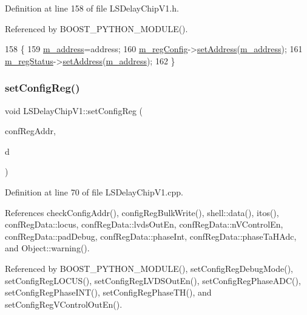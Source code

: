 Definition at line 158 of file L\+S\+Delay\+Chip\+V1.\+h.



Referenced by B\+O\+O\+S\+T\+\_\+\+P\+Y\+T\+H\+O\+N\+\_\+\+M\+O\+D\+U\+L\+E().


\begin{DoxyCode}
158                              \{
159     \hyperlink{classLSDelayChipV1_a6fba278fd2ac602c796b5e5cebf2d2de}{m\_address}=address;
160     \hyperlink{classLSDelayChipV1_afd1cfdcb114549dc1466c77f07d39fe0}{m\_regConfig}->\hyperlink{classIOobject_ae0d372aaeafe3da3c239677118deb2ac}{setAddress}(\hyperlink{classLSDelayChipV1_a6fba278fd2ac602c796b5e5cebf2d2de}{m\_address});
161     \hyperlink{classLSDelayChipV1_aaf118f103e89a35d2c449e8e3ffe8c20}{m\_regStatus}->\hyperlink{classIOobject_ae0d372aaeafe3da3c239677118deb2ac}{setAddress}(\hyperlink{classLSDelayChipV1_a6fba278fd2ac602c796b5e5cebf2d2de}{m\_address});
162   \}
\end{DoxyCode}
\mbox{\label{classLSDelayChipV1_a11fa2ebfa37c5cf0544ddb68c7d43e94}} 
\subsubsection{\texorpdfstring{set\+Config\+Reg()}{setConfigReg()}}
{\footnotesize\ttfamily void L\+S\+Delay\+Chip\+V1\+::set\+Config\+Reg (\begin{DoxyParamCaption}\item[{\hyperlink{ICECALv3_8h_a3cb25ca6f51f003950f9625ff05536fc}{U8}}]{conf\+Reg\+Addr,  }\item[{\hyperlink{structconfRegData}{conf\+Reg\+Data}}]{d }\end{DoxyParamCaption})}



Definition at line 70 of file L\+S\+Delay\+Chip\+V1.\+cpp.



References check\+Config\+Addr(), config\+Reg\+Bulk\+Write(), shell\+::data(), itos(), conf\+Reg\+Data\+::locus, conf\+Reg\+Data\+::lvds\+Out\+En, conf\+Reg\+Data\+::n\+V\+Control\+En, conf\+Reg\+Data\+::pad\+Debug, conf\+Reg\+Data\+::phase\+Int, conf\+Reg\+Data\+::phase\+Ta\+H\+Adc, and Object\+::warning().



Referenced by B\+O\+O\+S\+T\+\_\+\+P\+Y\+T\+H\+O\+N\+\_\+\+M\+O\+D\+U\+L\+E(), set\+Config\+Reg\+Debug\+Mode(), set\+Config\+Reg\+L\+O\+C\+U\+S(), set\+Config\+Reg\+L\+V\+D\+S\+Out\+En(), set\+Config\+Reg\+Phase\+A\+D\+C(), set\+Config\+Reg\+Phase\+I\+N\+T(), set\+Config\+Reg\+Phase\+T\+H(), and set\+Config\+Reg\+V\+Control\+Out\+En().


